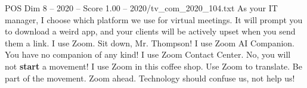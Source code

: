\begin{textsample}{POS Dim 8 – 2020 – Score 1.00 – 2020/tv\_com\_2020\_104.txt}  \label{ex:f8_pos_026}
As your IT manager, I choose which platform we use for virtual meetings.
It will prompt you to download a weird app, and your clients will be actively upset when you send them a link.
I use Zoom.
Sit down, Mr.
Thompson!
I use Zoom AI Companion.
You have no companion of any kind!
I use Zoom Contact Center.
No, you will not \textbf{start} a movement!
I use Zoom in this coffee shop.
Use Zoom to translate.
Be part of the movement.
Zoom ahead.
Technology should confuse us, not help us!

\end{textsample}
